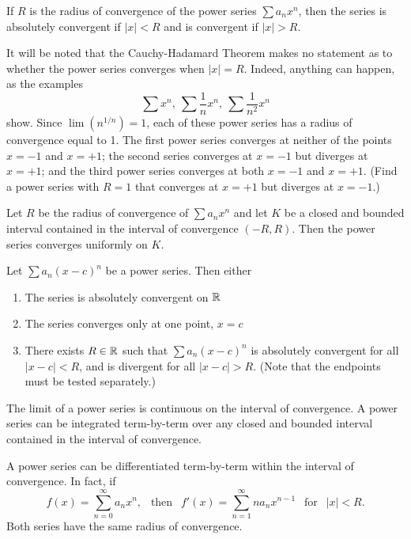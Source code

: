 \begin{theorem}
	If $R$ is the radius of convergence of the power series $\sum a_nx^n$, then the series is absolutely convergent if $|x|<R$ and is convergent if $|x|>R$.
\end{theorem}

\begin{remark}
	It will be noted that the Cauchy-Hadamard Theorem makes no statement as to whether the power series converges when $|x|=R$. Indeed, anything can happen, as the examples
	\[\sum x^n,\ \sum \frac{1}{n}x^n,\ \sum \frac{1}{n^2}x^n\]
	show. Since $\lim(n^{1/n})=1$, each of these power series has a radius of convergence equal to 1. The first power series converges at neither of the points $x=-1$ and $x=+1$; the second series converges at $x=-1$ but diverges at $x=+1$; and the third power series converges at both $x=-1$ and $x=+1$. (Find a power series with $R=1$ that converges at $x=+1$ but diverges at $x=-1$.)
\end{remark}

\begin{theorem}
	Let $R$ be the radius of convergence of $\sum a_nx^n$ and let $K$ be a closed and bounded interval contained in the interval of convergence $(-R, R)$. Then the power series converges uniformly on $K$.
\end{theorem}

\begin{theorem}
	Let $\sum a_n(x-c)^n$ be a power series. Then either
	\begin{enumerate}
		\item The series is absolutely convergent on $\mathbb{R}$
		\item The series converges only at one point, $x=c$
		\item There exists $R \in \mathbb{R}$ such that $\sum a_n(x-c)^n$ is absolutely convergent for all $|x-c|<R$, and is divergent for all $|x-c|>R$. (Note that the endpoints must be tested separately.)
	\end{enumerate}
\end{theorem}

\begin{theorem}
	The limit of a power series is continuous on the interval of convergence. A power series can be integrated term-by-term over any closed and bounded interval contained in the interval of convergence.
\end{theorem}

\begin{theorem}
	A power series can be differentiated term-by-term within the interval of convergence. In fact, if
	\[f(x)=\sum\limits_{n=0}^{\infty}a_nx^n,\ \ \text{  then  }\ \ f'(x)=\sum\limits_{n=1}^{\infty}na_nx^{n-1}\ \ \text{  for  }\ \ |x|<R.\]
	Both series have the same radius of convergence.
\end{theorem}

